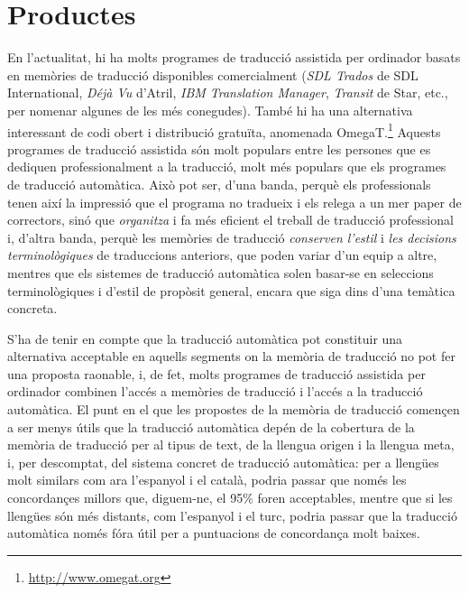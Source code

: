 



\section{Productes}

En l'actualitat, hi ha molts programes de traducció assistida per
ordinador basats en memòries de traducció disponibles comercialment
(\emph{SDL Trados} de SDL International, \emph{Déjà Vu} d'Atril,
\emph{IBM Translation Manager}, \emph{Transit} de Star, etc., per
nomenar algunes de les més conegudes). També hi ha una alternativa
interessant de codi obert i distribució gratuïta, anomenada
OmegaT.\footnote{\url{http://www.omegat.org}} Aquests programes de
traducció assistida són molt populars entre les persones que es
dediquen professionalment a la traducció, molt més populars que els
programes de traducció automàtica. Això pot ser, d'una banda, perquè
els professionals tenen així la impressió que el programa no tradueix
i els relega a un mer paper de correctors, sinó que \emph{organitza} i
fa més eficient el treball de traducció professional i, d'altra banda,
perquè les memòries de traducció \emph{conserven l'estil} i \emph{les
  decisions terminològiques} de traduccions anteriors, que poden
variar d'un equip a altre, mentres que els sistemes de traducció
automàtica solen basar-se en seleccions terminològiques i d'estil de
propòsit general, encara que siga dins d'una temàtica concreta.

S'ha de tenir en compte que la traducció automàtica pot constituir una
alternativa acceptable en aquells segments on la memòria de traducció
no pot fer una proposta raonable, i, de fet, molts programes de
traducció assistida per ordinador combinen l'accés a memòries de
traducció i l'accés a la traducció automàtica. El punt en el que les
propostes de la memòria de traducció començen a ser menys útils que la
traducció automàtica depén de la cobertura de la memòria de traducció
per al tipus de text, de la llengua origen i la llengua meta, i, per
descomptat, del sistema concret de traducció automàtica: per a
llengües molt similars com ara l'espanyol i el català, podria passar
que només les concordançes millors que, diguem-ne, el 95\% foren
acceptables, mentre que si les llengües són més distants, com
l'espanyol i el turc, podria passar que la traducció automàtica només
fóra útil per a puntuacions de concordança molt baixes.

